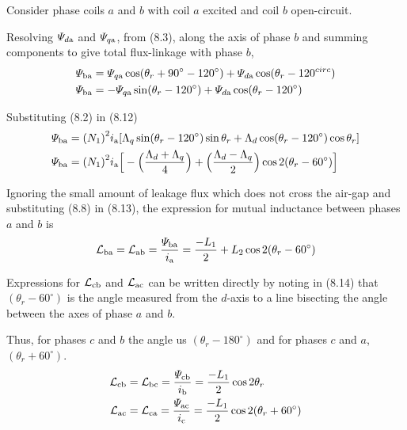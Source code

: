 \documentclass[a4paper,numbers=noenddot,12pt]{scrbook}
\begin{document}
Consider phase coils $a$ and $b$ with coil $a$ excited and coil $b$ open-circuit.

Resolving $\varPsi_{d\textup{a}}$ and $\varPsi_{q\textup{a}}$, from (8.3), along the axis of phase $b$ and summing components to give total flux-linkage with phase $b$,
\begin{align}
    \varPsi_{\textup{ba}} & = \varPsi_{q\textup{a}} \cos (\theta_r + 90^{\circ} -120^{\circ}) +\varPsi_{d\textup{a}} \cos(\theta_r - 120^{circ}) \nonumber \\
    \varPsi_{\textup{ba}} & = -\varPsi_{q\textup{a}} \sin (\theta_r - 120^{\circ}) + \varPsi_{d\textup{a}} \cos(\theta_r -120^{\circ}) 
    \label{eq:Eq8.12}
\end{align}

Substituting (8.2) in (8.12)
\begin{align}
    \varPsi_{\textup{ba}} & = {(N_1)}^2 i_{\textup{a}}[\Lambda_q \sin(\theta_r -120^{\circ}) \sin \theta_r + \Lambda_d \cos(\theta_r -120^{\circ}) \cos \theta_r] \nonumber \\
    \varPsi_{\textup{ba}} & = {(N_1)}^2 i_{\textup{a}} \Big[ - \Big( \dfrac{\Lambda_d + \Lambda_q}{4} \Big) + \Big( \dfrac{\Lambda_d - \Lambda_q}{2}\Big) \cos 2(\theta_r - 60^{\circ})\Big]
    \label{eq:Eq8.13}
\end{align}

Ignoring the small amount of leakage flux which does not cross the air-gap and substituting (8.8) in (8.13), the expression for mutual inductance between phases $a$ and $b$ is
\begin{equation}
    \mathcal{L}_{\textup{ba}} = \mathcal{L}_{\textup{ab}} = \dfrac{\varPsi_{\textup{ba}}}{i_{\textup{a}}} = \dfrac{-L_1}{2} + L_2 \cos 2(\theta_r - 60^{\circ})
    \label{eq:Eq8.14}
\end{equation}

Expressions for $\mathcal{L}_{\textup{cb}}$ and $\mathcal{L}_{\textup{ac}}$ can be written directly by noting in (8.14) that $(\theta_r - 60^{\circ})$ is the angle measured from the $d$-axis to a line bisecting the angle between the axes of phase $a$ and $b$.

Thus, for phases $c$ and $b$ the angle us $(\theta_r - 180^{\circ})$ and for phases $c$ and $a$, $(\theta_r + 60^{\circ})$.
\begin{align}
    \mathcal{L}_{\textup{cb}} & = \mathcal{L}_{\textup{bc}} = \dfrac{\varPsi_{\textup{cb}}}{i_{\textup{b}}} = \dfrac{-L_1}{2} \cos 2\theta_r \\
    \mathcal{L}_{\textup{ac}} & = \mathcal{L}_{\textup{ca}} = \dfrac{\varPsi_{\textup{ac}}}{i_{\textup{c}}} = \dfrac{-L_1}{2} \cos 2(\theta_r + 60^{\circ}) 
    \label{eq:Eq8.16}
\end{align}
\end{document}

